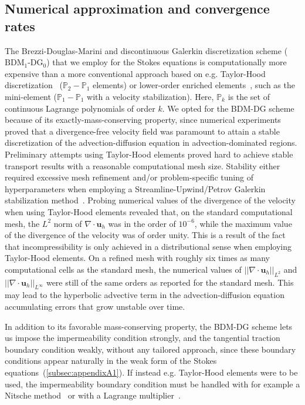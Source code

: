 \documentclass[fleqn]{wlscirep}
\newcommand{\normltwo}[1]{{ \vert\vert#1\vert\vert}_{L^2}}
\newcommand{\normlinf}[1]{{\vert\vert#1\vert\vert}_{L^{\infty}}}
\newcommand{\uu}{\mathbf{u}}
\begin{document}
\subsection*{Numerical approximation and convergence rates}
The Brezzi-Douglas-Marini and discontinuous Galerkin discretization scheme
($\mathrm{BDM}_1$-$\mathrm{DG}_0$) that we employ for the Stokes equations
is computationally more expensive than a more conventional approach based on
e.g. Taylor-Hood discretization~\cite{Stenberg1990ErrorProblem}
($\mathbb{P}_2-\mathbb{P}_1$ elements) or lower-order enriched elements~\cite{Brezzi2011MixedMethods},
such as the mini-element ($\mathbb{P}_1-\mathbb{P}_1$ with a velocity stabilization).
Here, $\mathbb{P}_k$ is the set of continuous Lagrange polynomials of order $k$.
We opted for the BDM-DG scheme because of its exactly-mass-conserving property,
since numerical experiments proved that a divergence-free velocity field was
paramount to attain a stable discretization of the advection-diffusion equation
in advection-dominated regions. Preliminary attempts using Taylor-Hood elements
proved hard to achieve stable transport results with a reasonable computational mesh size.
Stability either required excessive mesh refinement and/or problem-specific tuning of
hyperparameters when employing a Streamline-Upwind/Petrov Galerkin stabilization
method~\cite{Franca1992StabilizedModel}. Probing numerical values of the divergence of
the velocity when using Taylor-Hood elements revealed that, on the standard computational
mesh, the $L^2$ norm of $\nabla\cdot\uu_h$ was in the order of $10^{-6}$, while the
maximum value of the divergence of the velocity was of order unity. This is a result
of the fact that incompressibility is only achieved in a distributional sense when
employing Taylor-Hood elements. On a refined mesh with roughly six times as many
computational cells as the standard mesh, the numerical values of
$\normltwo{\nabla\cdot\uu_h}$ and $\normlinf{\nabla\cdot\uu_h}$ were still
of the same orders as reported for the standard mesh. This may lead to the
hyperbolic advective term in the advection-diffusion equation accumulating errors
that grow unstable over time. 

In addition to its favorable mass-conserving property, the BDM-DG scheme
lets us impose the impermeability condition strongly, and the tangential
traction boundary condition weakly, without any tailored approach,
since these boundary conditions appear naturally in the weak form of the
Stokes equations~(\cref{subsec:appendixA1}). If instead e.g. Taylor-Hood
elements were to be used, the impermeability boundary condition must
be handled with for example a Nitsche method~\cite{Nitsche1971UberSind}
or with a Lagrange multiplier~\cite{Babuska1973TheMultipliers, Bertoluzza2017BoundaryHemodynamics}. 
\end{document}
